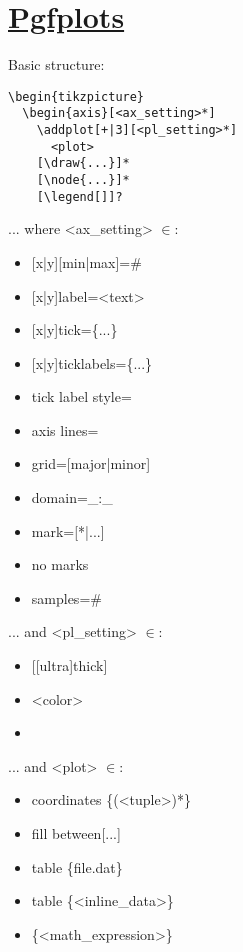 \section{\href{http://mirrors.ctan.org/graphics/pgf/contrib/pgfplots/doc/pgfplots.pdf}{Pgfplots}}
Basic structure:\\
\begin{minipage}{6.5cm}
\begin{lstlisting}
\begin{tikzpicture}
  \begin{axis}[<ax_setting>*]
    \addplot[+|3][<pl_setting>*]
      <plot>
    [\draw{...}]*
    [\node{...}]*
    [\legend[]]?
\end{lstlisting}
\end{minipage}
... where <ax\_setting> $\in$: 
\begin{multicols}{2}
\begin{itemize}[label={}]
    \item {[x|y]}[min|max]=\#
    \item {[x|y]}label=<text>
    \item {[x|y]}tick=\{...\}
    \item {[x|y]}ticklabels=\{...\}
    \item tick label style=
    \item axis lines=
    \item grid=[major|minor]
    \item domain=\_:\_
    \item mark=[*|...]
    \item no marks
    \item samples=\#
\end{itemize}
\end{multicols}
... and <pl\_setting> $\in$: 
\begin{multicols}{2}
\begin{itemize}[label={}]
    \item {[[ultra]thick]}
    \item <color>
    \item 
\end{itemize}
\end{multicols}
... and <plot> $\in$:
\begin{itemize}[label={}]
    \item coordinates \{(<tuple>)*\}
    \item fill between[...]
    \item table \{file.dat\}
    \item table \{<inline\_data>\}
    \item \{<math\_expression>\}
\end{itemize}
